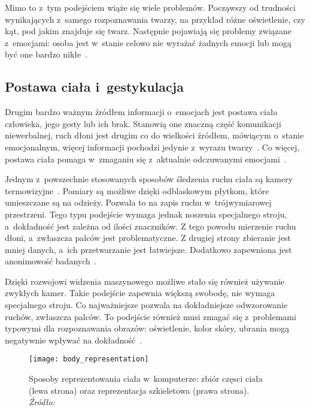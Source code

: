 Mimo to z~tym podejściem wiąże się wiele problemów.
Począwszy od trudności wynikających z~samego rozpoznawania twarzy, na przykład różne oświetlenie, czy kąt, pod jakim znajduje się twarz.
Następnie pojawiają się problemy związane z~emocjami: osoba jest w~stanie celowo nie wyrażać żadnych emocji lub mogą być one bardzo nikłe~\cite{Calvo2015}.


\subsection{Postawa ciała i~gestykulacja}\label{subsec:postawa-ciaa-i-gestykulacja}

Drugim bardzo ważnym źródłem informacji o~emocjach jest postawa ciała człowieka, jego gesty lub ich brak.
Stanowią one znaczną część komunikacji niewerbalnej, ruch dłoni jest drugim co do wielkości źródłem, mówiącym o~stanie emocjonalnym, więcej informacji pochodzi jedynie z~wyrazu twarzy~\cite{Noroozi2021}.
Co więcej, postawa ciała pomaga w~zmaganiu się z~aktualnie odczuwanymi emocjami~\cite{Kleinsmith2013}.

Jednym z~powszechnie stosowanych sposobów śledzenia ruchu ciała są kamery termowizyjne~\cite{Calvo2015}.
Pomiary są możliwe dzięki odblaskowym płytkom, które umieszczane są na odzieży.
Pozwala to na zapis ruchu w~trójwymiarowej przestrzeni.
Tego typu podejście wymaga jednak noszenia specjalnego stroju, a~dokładność jest zależna od ilości znaczników.
Z tego powodu mierzenie ruchu dłoni, a~zwłaszcza palców jest problematyczne.
Z drugiej strony zbieranie jest mniej danych, a~ich przetwarzanie jest łatwiejsze.
Dodatkowo zapewniona jest anonimowość badanych~\cite{Calvo2015}.

Dzięki rozwojowi widzenia maszynowego możliwe stało się również używanie zwykłych kamer.
Takie podejście zapewnia większą swobodę, nie wymaga specjalnego stroju.
Co najważniejsze pozwala na dokładniejsze odwzorowanie ruchów, zwłaszcza palców.
To podejście również musi zmagać się z~problemami typowymi dla rozpoznawania obrazów: oświetlenie, kolor skóry, ubrania mogą negatywnie wpływać na dokładność~\cite{Calvo2015}.

\begin{figure}[h]
    \centering
    \texttt{[image: body\_representation]}
    \caption{Sposoby reprezentowania ciała w~komputerze: zbiór częsci ciała (lewa strona) oraz reprezentacja szkieletowa (prawa strona). \textit{Źródło:~\cite{Noroozi2021}}}
    \label{fig:body-representation}
\end{figure}


